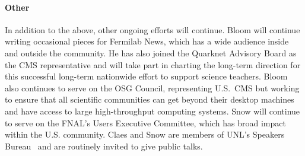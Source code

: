 \paragraph{Other} In addition to the above, other ongoing efforts will continue.  Bloom will continue writing occasional pieces for Fermilab News, which has a wide audience inside and outside the community.  He has also joined the Quarknet Advisory Board as the CMS representative and will take part in charting the long-term direction for this successful long-term nationwide effort to support science teachers.  Bloom also continues to serve on the OSG Council, representing U.S.~CMS but working to ensure that all scientific communities can get beyond their desktop machines and have access to large high-throughput computing systems. Snow will  continue to serve on the FNAL's Users Executive Committee, which has broad impact within the U.S. community. Claes and Snow are members of UNL's Speakers Bureau~\cite{bib:speakers} and are routinely invited to give public talks.
